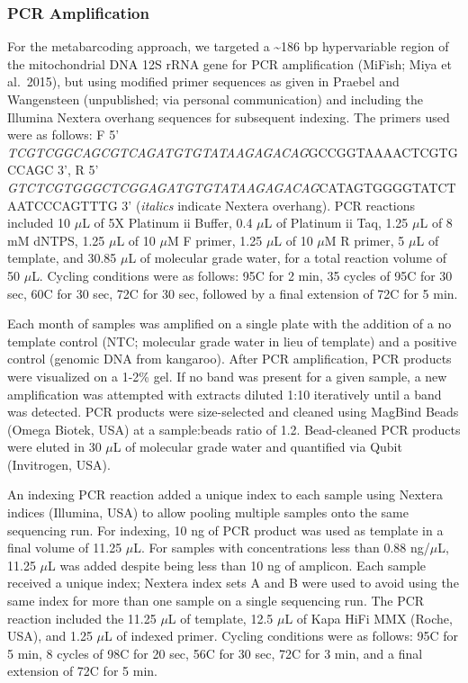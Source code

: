 \documentclass[
]{article}
\begin{document}
\hypertarget{pcr-amplification}{%
\subsubsection{PCR Amplification}\label{pcr-amplification}}

For the metabarcoding approach, we targeted a \textasciitilde186 bp
hypervariable region of the mitochondrial DNA 12S rRNA gene for PCR
amplification (MiFish; Miya et al.~2015), but using modified primer
sequences as given in Praebel and Wangensteen (unpublished; via personal
communication) and including the Illumina Nextera overhang sequences for
subsequent indexing. The primers used were as follows: F 5'
\emph{TCGTCGGCAGCGTCAGATGTGTATAAGAGACAG}GCCGGTAAAACTCGTGCCAGC 3', R 5'
\emph{GTCTCGTGGGCTCGGAGATGTGTATAAGAGACAG}CATAGTGGGGTATCTAATCCCAGTTTG 3'
(\emph{italics} indicate Nextera overhang). PCR reactions included 10
\(\mu\)L of 5X Platinum ii Buffer, 0.4 \(\mu\)L of Platinum ii Taq, 1.25
\(\mu\)L of 8 mM dNTPS, 1.25 \(\mu\)L of 10 \(\mu\)M F primer, 1.25
\(\mu\)L of 10 \(\mu\)M R primer, 5 \(\mu\)L of template, and 30.85
\(\mu\)L of molecular grade water, for a total reaction volume of 50
\(\mu\)L. Cycling conditions were as follows: 95\degree C for 2 min, 35
cycles of 95\degree C for 30 sec, 60\degree C for 30 sec, 72\degree C
for 30 sec, followed by a final extension of 72\degree C for 5 min.

Each month of samples was amplified on a single plate with the addition
of a no template control (NTC; molecular grade water in lieu of
template) and a positive control (genomic DNA from kangaroo). After PCR
amplification, PCR products were visualized on a 1-2\% gel. If no band
was present for a given sample, a new amplification was attempted with
extracts diluted 1:10 iteratively until a band was detected. PCR
products were size-selected and cleaned using MagBind Beads (Omega
Biotek, USA) at a sample:beads ratio of 1.2. Bead-cleaned PCR products
were eluted in 30 \(\mu\)L of molecular grade water and quantified via
Qubit (Invitrogen, USA).

An indexing PCR reaction added a unique index to each sample using
Nextera indices (Illumina, USA) to allow pooling multiple samples onto
the same sequencing run. For indexing, 10 ng of PCR product was used as
template in a final volume of 11.25 \(\mu\)L. For samples with
concentrations less than 0.88 ng/\(\mu\)L, 11.25 \(\mu\)L was added
despite being less than 10 ng of amplicon. Each sample received a unique
index; Nextera index sets A and B were used to avoid using the same
index for more than one sample on a single sequencing run. The PCR
reaction included the 11.25 \(\mu\)L of template, 12.5 \(\mu\)L of Kapa
HiFi MMX (Roche, USA), and 1.25 \(\mu\)L of indexed primer. Cycling
conditions were as follows: 95\degree C for 5 min, 8 cycles of
98\degree C for 20 sec, 56\degree C for 30 sec, 72\degree C for 3 min,
and a final extension of 72\degree C for 5 min.
\end{document}
